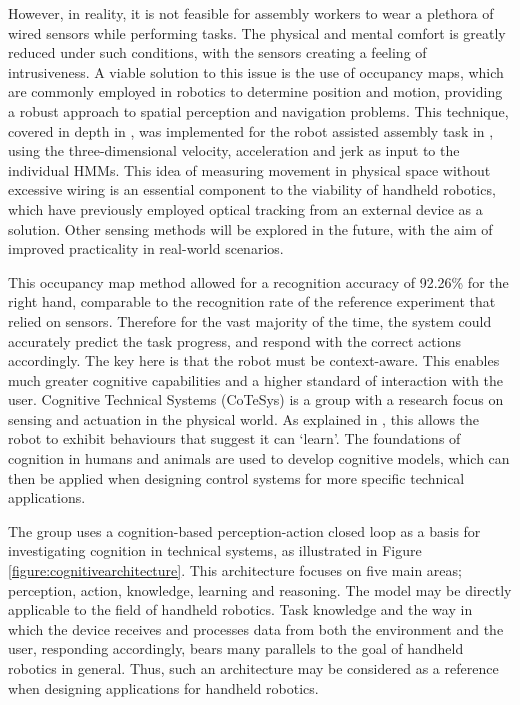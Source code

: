 \documentclass[11pt]{article}
\begin{document}
However, in reality, it is not feasible for assembly workers to wear a plethora of wired sensors while performing tasks. The physical and mental comfort is greatly reduced under such conditions, with the sensors creating a feeling of intrusiveness. A viable solution to this issue is the use of occupancy maps, which are commonly employed in robotics to determine position and motion, providing a robust approach to spatial perception and navigation problems. This technique, covered in depth in \cite{elfes1989}, was implemented for the robot assisted assembly task in \cite{lenz2011}, using the three-dimensional velocity, acceleration and jerk as input to the individual HMMs. This idea of measuring movement in physical space without excessive wiring is an essential component to the viability of handheld robotics, which have previously employed optical tracking from an external device as a solution. Other sensing methods will be explored in the future, with the aim of improved practicality in real-world scenarios.

This occupancy map method allowed for a recognition accuracy of 92.26\% for the right hand, comparable to the recognition rate of the reference experiment that relied on sensors. Therefore for the vast majority of the time, the system could accurately predict the task progress, and respond with the correct actions accordingly. The key here is that the robot must be context-aware. This enables much greater cognitive capabilities and a higher standard of interaction with the user. Cognitive Technical Systems (CoTeSys) is a group with a research focus on sensing and actuation in the physical world. As explained in \cite{buss2010}, this allows the robot to exhibit behaviours that suggest it can `learn'. The foundations of cognition in humans and animals are used to develop cognitive models, which can then be applied when designing control systems for more specific technical applications. 

The group uses a cognition-based perception-action closed loop as a basis for investigating cognition in technical systems, as illustrated in Figure \ref{figure:cognitivearchitecture}. This architecture focuses on five main areas; perception, action, knowledge, learning and reasoning. The model may be directly applicable to the field of handheld robotics. Task knowledge and the way in which the device receives and processes data from both the environment and the user, responding accordingly, bears many parallels to the goal of handheld robotics in general. Thus, such an architecture may be considered as a reference when designing applications for handheld robotics. 
\end{document}
